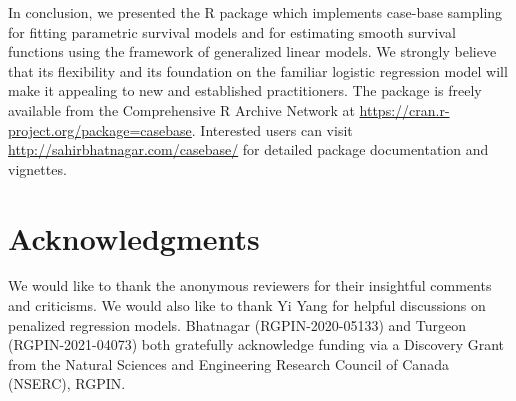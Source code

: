 In conclusion, we presented the R package  which
implements case-base sampling for fitting parametric survival models and
for estimating smooth survival functions using the framework of
generalized linear models. We strongly believe that its flexibility and
its foundation on the familiar logistic regression model will make it
appealing to new and established practitioners. The 
package is freely available from the Comprehensive R Archive Network at
\url{https://cran.r-project.org/package=casebase}. Interested users can
visit \url{http://sahirbhatnagar.com/casebase/} for detailed package
documentation and vignettes.

\hypertarget{acknowledgments}{%
\section{Acknowledgments}\label{acknowledgments}}

We would like to thank the anonymous reviewers for their insightful
comments and criticisms. We would also like to thank Yi Yang for helpful
discussions on penalized regression models. \mbox{Bhatnagar}
(RGPIN-2020-05133) and \mbox{Turgeon} (RGPIN-2021-04073) both gratefully
acknowledge funding via a Discovery Grant from the Natural Sciences and
Engineering Research Council of Canada (NSERC), RGPIN.



\address{%
Sahir Rai Bhatnagar*\\
McGill University\\%
2001 McGill College Avenue Montreal, QC, Canada H3A 1G1\\
%
\url{http://sahirbhatnagar.com/}\\%
%
%
}

\address{%
Maxime Turgeon*\\
University of Manitoba\\%
186 Dysart Road Winnipeg, MB, Canada R3T 2N2\\
%
\url{https://maxturgeon.ca/}\\%
%
%
}

\address{%
Jesse Islam\\
McGill University\\%
2001 McGill College Avenue Montreal, QC, Canada H3A 1G1\\
%
%
%
%
}

\address{%
James A. Hanley\\
McGill University\\%
2001 McGill College Avenue Montreal, QC, Canada H3A 1G1\\
%
\url{http://www.medicine.mcgill.ca/epidemiology/hanley/}\\%
%
%
}

\address{%
Olli Saarela\\
University of Toronto\\%
Dalla Lana School of Public Health, 155 College Street, 6th floor,
Toronto, Ontario M5T 3M7, Canada\\
%
\url{http://individual.utoronto.ca/osaarela/}\\%
%
%
}
